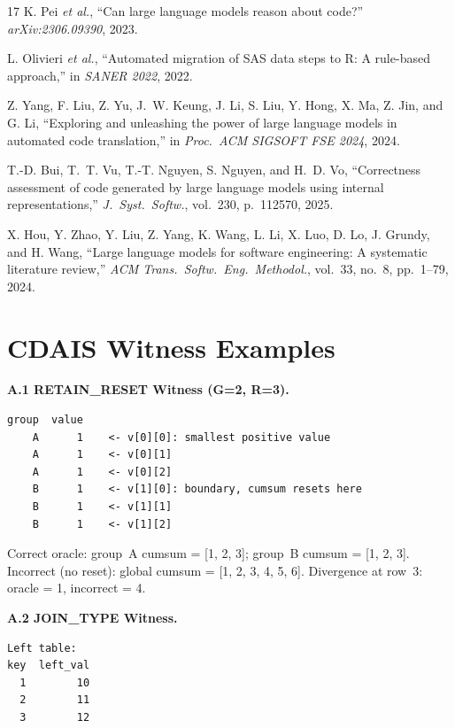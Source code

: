 \documentclass[conference]{IEEEtran}
\begin{document}
\begin{thebibliography}{17}
K. Pei \emph{et al.},
``Can large language models reason about code?''
\emph{arXiv:2306.09390}, 2023.

L. Olivieri \emph{et al.},
``Automated migration of SAS data steps to R: A rule-based approach,''
in \emph{SANER 2022}, 2022.

Z. Yang, F. Liu, Z. Yu, J.~W. Keung, J. Li, S. Liu, Y. Hong, X. Ma, Z. Jin,
  and G. Li,
``Exploring and unleashing the power of large language models in automated code
  translation,''
in \emph{Proc.\ ACM SIGSOFT FSE 2024}, 2024.

T.-D. Bui, T.~T. Vu, T.-T. Nguyen, S. Nguyen, and H.~D. Vo,
``Correctness assessment of code generated by large language models using internal
  representations,''
\emph{J.\ Syst.\ Softw.}, vol.~230, p.~112570, 2025.

X. Hou, Y. Zhao, Y. Liu, Z. Yang, K. Wang, L. Li, X. Luo, D. Lo, J. Grundy,
  and H. Wang,
``Large language models for software engineering: A systematic literature review,''
\emph{ACM Trans.\ Softw.\ Eng.\ Methodol.}, vol.~33, no.~8, pp.~1--79, 2024.

\end{thebibliography}


\appendix

\section{CDAIS Witness Examples}

\textbf{A.1 RETAIN\_RESET Witness (G=2, R=3).}

\begin{lstlisting}
group  value
    A      1    <- v[0][0]: smallest positive value
    A      1    <- v[0][1]
    A      1    <- v[0][2]
    B      1    <- v[1][0]: boundary, cumsum resets here
    B      1    <- v[1][1]
    B      1    <- v[1][2]
\end{lstlisting}

Correct oracle: group~A cumsum = [1, 2, 3]; group~B cumsum = [1, 2, 3].
Incorrect (no reset): global cumsum = [1, 2, 3, 4, 5, 6].
Divergence at row~3: oracle = 1, incorrect = 4.

\textbf{A.2 JOIN\_TYPE Witness.}

\begin{lstlisting}
Left table:
key  left_val
  1        10
  2        11
  3        12
\end{lstlisting}
\end{document}
